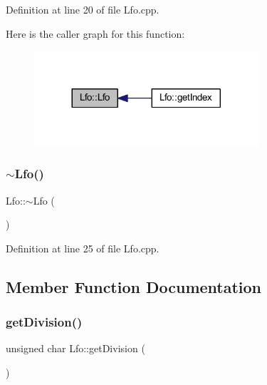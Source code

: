 Definition at line 20 of file Lfo.\+cpp.

Here is the caller graph for this function\+:
\nopagebreak
\begin{figure}[H]
\begin{center}
\leavevmode
\includegraphics[width=236pt]{d6/d5f/class_lfo_aa1546b11ce8b14895de9200209006332_icgraph}
\end{center}
\end{figure}
\mbox{\label{class_lfo_a95e36a9f84091073c742983741247367}} 
\subsubsection{\texorpdfstring{$\sim$\+Lfo()}{~Lfo()}}
{\footnotesize\ttfamily Lfo\+::$\sim$\+Lfo (\begin{DoxyParamCaption}{ }\end{DoxyParamCaption})}



Definition at line 25 of file Lfo.\+cpp.



\subsection{Member Function Documentation}
\mbox{\label{class_lfo_afba7d39f952c4b02d101f8e46e9cc20d}} 
\subsubsection{\texorpdfstring{get\+Division()}{getDivision()}}
{\footnotesize\ttfamily unsigned char Lfo\+::get\+Division (\begin{DoxyParamCaption}{ }\end{DoxyParamCaption})\hspace{0.3cm}{\ttfamily [inline]}}



